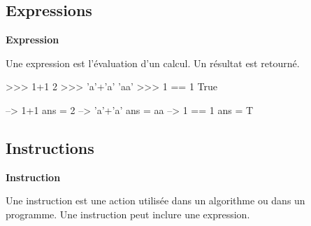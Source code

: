 \documentclass[11pt,oneside]{article}
\begin{document}
\subsection{Expressions}

\begin{defi}
\textbf{Expression}

Une expression est l'évaluation d'un calcul. Un résultat est retourné. 
\end{defi}

\begin{exemple}
\begin{minipage}[c]{.45\linewidth}
\begin{py}
\begin{python}
>>> 1+1
	2
>>> 'a'+'a'
	'aa'
>>> 1 == 1
	True
\end{python}
\end{py}
\end{minipage}\hfill
\begin{minipage}[c]{.45\linewidth}
\begin{sci}
\begin{scilab}
--> 1+1
	ans = 2
--> 'a'+'a'
	ans = aa
--> 1 == 1
	ans = T
\end{scilab}
\end{sci}
\end{minipage}
\end{exemple}


\subsection{Instructions}


\begin{defi}
\textbf{Instruction}

Une instruction est une action utilisée dans un algorithme ou dans un programme. Une instruction peut inclure une expression.
\end{defi}
\end{document}
